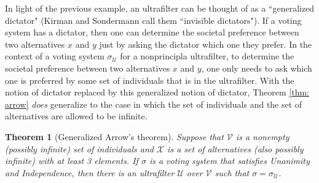 \documentclass[a4paper]{memoir}
\newtheorem{theorem}{Theorem}[section]
\theoremstyle{definition}
\newcommand{\mc}{\mathcal}
\begin{document}
In light of the previous example, an ultrafilter can be thought of as a ``generalized dictator" 
(Kirman and Sondermann call them ``invisible dictators"). 
If a voting system has a dictator, then one can determine the societal preference between 
two alternatives $x$ and $y$ just by asking the dictator which one they prefer. In the context 
of a voting system $\sigma_{\mc{U}}$ for a nonprincipla ultrafilter, to determine the societal 
preference between two alternatives $x$ and $y$, one only needs to ask which one is preferred 
by some set of individuals that is in the ultrafilter. With the notion of dictator replaced by 
this generalized notion of dictator, Theorem \ref{thm: arrow} \emph{does} generalize to the case 
in which the set of individuals and the set of alternatives are allowed to be infinite.

\begin{theorem}[Generalized Arrow's theorem] \label{thm: generalized_arrow}
  Suppose that $\mc{V}$ is a nonempty (possibly infinite) set of individuals and 
  $\mc{X}$ is a set of alternatives (also possibly infinite) with at least 3 elements. 
  If $\sigma$ is a voting system that satisfies Unanimity and Independence, then there is 
  an ultrafilter $\mc{U}$ over $\mc{V}$ such that $\sigma = \sigma_{\mc{U}}$.
\end{theorem}
\end{document}
